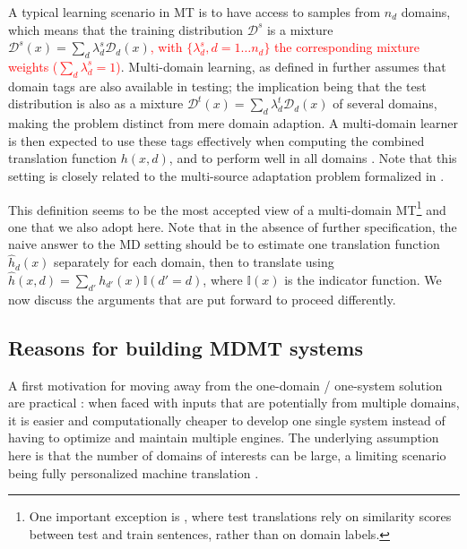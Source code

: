 \documentclass[11pt,a4paper]{article}
\newcommand{\fyTodo}[1]{\Todo[FY:]{\textcolor{orange}{#1}}}
\newcommand{\revision}[1]{\textcolor{red}{#1}}
\newcommand{\indic}[1]{\ensuremath{\mathbb{I}(#1)}}
\begin{document}
A typical learning scenario in MT is to have access to samples from $n_d$ domains, which means that the training distribution $\mathcal{D}^s$ is a mixture $\mathcal{D}^s(x) = \sum_d \lambda^{s}_{d} \mathcal{D}_d(x)$\revision{, with $\{\lambda^{s}_d, d=1 \dots n_d\}$ the corresponding mixture weights ($\sum_d \lambda^{s}_d=1$)}. Multi-domain learning, as defined in \cite{Dredze08online} further assumes that domain tags are also available in testing; the implication being that the test distribution is also as a mixture $\mathcal{D}^t(x) = \sum_d \lambda^{t}_{d} \mathcal{D}_d(x)$ of several domains, making the problem distinct from mere domain adaption.  A multi-domain learner is then expected to use these tags effectively \cite{Joshi12multidomain} when computing the combined translation function $h(x,d)$, and to perform well in all domains \cite{Finkel09hierarchical}. Note that this setting is closely related to the multi-source adaptation problem formalized in \cite{Mansour09domainadaptation,Mansour09multiple,Hoffman18algorithms}.

This definition seems to be the most accepted view of a multi-domain MT\footnote{One important exception is \cite{Farajian17multidomain}, where test translations rely on similarity scores between test and train sentences, rather than on domain labels.} and one that we also adopt here. Note that in the absence of further specification, the naive answer to the MD setting should be to estimate one translation function $\hat{h}_d(x)$ separately for each domain, then to translate using $\hat{h}(x,d) = \sum_{d'} h_{d'}(x) \indic{d' = d}$, where $\indic{x}$ is the indicator function. We now discuss the arguments that are put forward to proceed differently.


\subsection{Reasons for building MDMT systems \label{ssec:whymdmt}}

A first motivation for moving away from the one-domain / one-system solution are practical  \cite{Sennrich13multidomain,Farajian17neural}: when faced with inputs that are potentially from multiple domains, it is easier and computationally cheaper to develop one single system instead of having to optimize and maintain multiple engines. The underlying assumption here is that the number of domains of interests can be large, a limiting scenario being fully personalized machine translation \cite{Michel2018extreme}.
\end{document}
